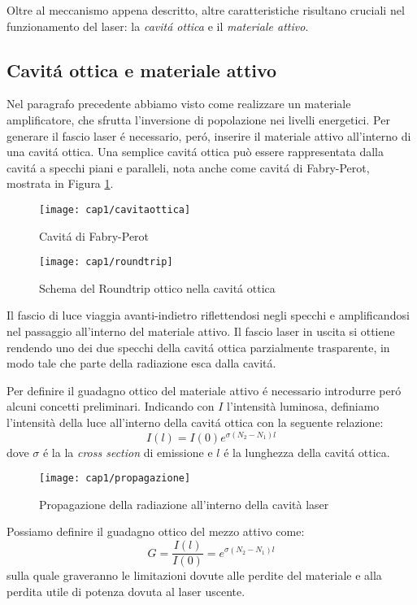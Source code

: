 Oltre al meccanismo appena descritto, altre caratteristiche risultano cruciali nel funzionamento del laser: la \textit{cavit\'a ottica} e il \textit{materiale attivo}.

\subsection{Cavit\'a ottica e materiale attivo}
Nel paragrafo precedente abbiamo visto come realizzare un materiale amplificatore, che sfrutta l'inversione di popolazione nei livelli energetici. Per generare il fascio laser \'e necessario, per\'o, inserire il materiale attivo all'interno di una cavit\'a ottica.
Una semplice cavit\'a ottica può essere rappresentata dalla cavit\'a a specchi piani e paralleli, nota anche come cavit\'a di Fabry-Perot, mostrata in Figura \ref{cavitaottica}. 
\begin{figure}[H]
	\begin{center}
		\texttt{[image: cap1/cavitaottica]}
		\caption{Cavit\'a di Fabry-Perot}
		\label{cavitaottica}
	\end{center}
\end{figure}
\begin{figure}[H]
  \begin{center}
    \texttt{[image: cap1/roundtrip]}
    \caption{Schema del Roundtrip ottico nella cavit\'a ottica}
    \label{roundtrip}
  \end{center}
\end{figure}
Il fascio di luce viaggia avanti-indietro riflettendosi negli specchi e amplificandosi nel passaggio all'interno del materiale attivo. Il fascio laser in uscita si ottiene rendendo uno dei due specchi della cavit\'a ottica parzialmente trasparente, in modo tale che parte della radiazione esca dalla cavit\'a.

Per definire il guadagno ottico del materiale attivo \'e necessario introdurre per\'o alcuni concetti preliminari. Indicando con $I$ l'intensità luminosa, definiamo l'intensità della luce all'interno della cavit\'a ottica con la seguente relazione:
\begin{equation}
I(l)=I(0)e^{\sigma(N_2-N_1)l}
\end{equation}
dove $\sigma$ \'e la la \textit{cross section} di emissione e $l$ \'e la lunghezza della cavit\'a ottica.

\begin{figure}[H]
  \begin{center}
    \texttt{[image: cap1/propagazione]}
    \caption{Propagazione della radiazione all'interno della cavità laser}
    \label{propagazione}
  \end{center}
\end{figure}
Possiamo definire il guadagno ottico del mezzo attivo come:
\begin{equation}
  G=\frac{I(l)}{I(0)}=e^{\sigma(N_2-N_1)l}
\end{equation}
sulla quale graveranno le limitazioni dovute alle perdite del materiale e alla perdita utile di potenza dovuta al laser uscente.

